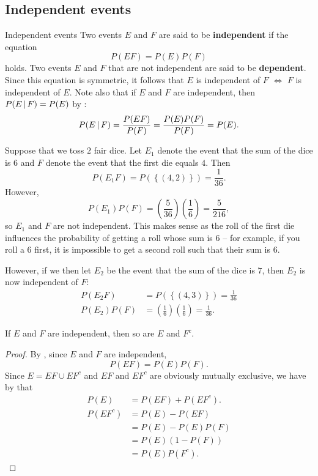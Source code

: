 \subsection{Independent events}
\begin{bdef}{Independent events}\label{independent}
    Two events $E$ and $F$ are said to be \textbf{independent} if the equation \[
        P(EF) = P(E)P(F)    
    \] holds. Two events $E$ and $F$ that are not independent are said to be \textbf{dependent}. Since this equation is symmetric, it follows that $E$ is independent of $F$ $\iff$ $F$ is independent of $E$. Note also that if $E$ and $F$ are independent, then $P(E \,\vert\, F) = P(E)$ by : \[
        P(E \,\vert\, F) = \frac{P(EF)}{P(F)} = \frac{P(E)P(F)}{P(F)} = P(E).
    \]
\end{bdef}
\begin{changebar}
    \begin{example}\label{independentdice}
        Suppose that we toss $2$ fair dice. Let $E_1$ denote the event that the sum of the dice is $6$ and $F$ denote the event that the first die equals $4$. Then \[
            P(E_1F) = P(\left\{ (4, 2) \right\}) = \frac{1}{36}.    
        \] However, \[
            P(E_1)P(F) = \left( \frac{5}{36} \right)\left( \frac{1}{6} \right) = \frac{5}{216},    
        \] so $E_1$ and $F$ are not independent. This makes sense as the roll of the first die influences the probability of getting a roll whose sum is $6$ -- for example, if you roll a $6$ first, it is impossible to get a second roll such that their sum is $6$.

        However, if we then let $E_2$ be the event that the sum of the dice is $7$, then $E_2$ is now independent of $F$: \[
            \begin{aligned}
                P(E_2F) &= P(\left\{ (4, 3) \right\}) = \frac{1}{36} \\
                P(E_2)P(F) &= \left( \frac{1}{6} \right)\left( \frac{1}{6} \right) =\frac{1}{36}.
            \end{aligned}    
        \]
    \end{example}
\end{changebar}
\begin{proposition}
    If $E$ and $F$ are independent, then so are $E$ and $F^c$.
\end{proposition}
\begin{proof}
    By , since $E$ and $F$ are independent, \[
        P(EF) = P(E)P(F).    
    \] Since $E = EF \cup EF^c$ and $EF$ and $EF^c$ are obviously mutually exclusive, we have by  that \[
        \begin{aligned}
            P(E) &= P(EF) + P(EF^c). \\
            P(EF^c) &= P(E) - P(EF) \\
            &= P(E) - P(E)P(F) \\
            &= P(E)(1-P(F)) \\
            &= P(E)P(F^c).
        \end{aligned}
    \]
\end{proof}
